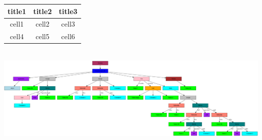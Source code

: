 \documentclass[12pt]{article}
\begin{document}
\begin{tabular}{||c|c|c||}
\hline
title1 & title2 & title3 \\
\hline
cell1 & cell2 & cell3 \\
\hline
cell4 & cell5 & cell6 \\
\hline
\end{tabular}\\
\includegraphics[scale=0.16]{fib.png}
\end{document}
